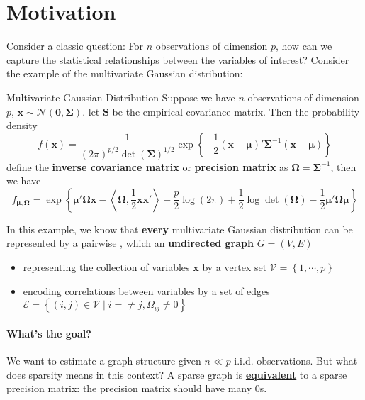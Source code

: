 \documentclass[twoside]{article}
\begin{document}

\section{Motivation}
Consider a classic question: For $n$ observations of dimension $p$, how can we capture the statistical relationships between the variables of interest? Consider the example of the multivariate Gaussian distribution:
\begin{example}{Multivariate Gaussian Distribution}{}
    Suppose we have $n$ observations of dimension $p$, $\mathbf{x}\sim \mathcal{N}(\mathbf{0},\boldsymbol{\Sigma})$. let $\mathbf{S}$ be the empirical covariance matrix. Then the probability density 
    $$
    f(\mathbf{x}) = \frac{1}{(2\pi)^{p/2}\det (\boldsymbol{\Sigma})^{1/2}}\exp\left\{ -\frac{1}{2}(\mathbf{x}-\boldsymbol{\mu})'\boldsymbol{\Sigma}^{-1}(\mathbf{x}-\boldsymbol{\mu}) \right\}
    $$
    define the \textbf{inverse covariance matrix} or \textbf{precision matrix} as $ \boldsymbol{\Omega}=\boldsymbol{\Sigma}^{-1} $, then we have 
    $$
    f_{\mathbf{\mu},\boldsymbol{\Omega}} = \exp \left\{ \boldsymbol{\mu'\Omega x} - \left< \boldsymbol{\Omega},\frac{1}{2}\mathbf{xx}' \right> -\frac{p}{2}\log(2\pi) + \frac{1}{2} \log\det(\boldsymbol{\Omega}) - \frac{1}{2}\boldsymbol{\mu'\Omega\mu} \right\}
    $$
\end{example}
In this example, we know that \textbf{every} multivariate Gaussian distribution can be represented by a pairwise , which an \textbf{\underline{undirected graph}} $G=(V,E)$
\begin{itemize}
    \item representing the collection of variables $\mathbf{x}$ by a vertex set $\mathcal{V}=\left\{1,\cdots,p\right\}$
    \item encoding correlations between variables by a set of edges $\mathcal{E}=\left\{ (i,j)\in \mathcal{V}\mid i=\neq j,\Omega_{ij}\neq 0 \right\}$  
\end{itemize}

\paragraph*{What's the goal?} We want to estimate a  graph structure given $n\ll p$ i.i.d. observations. But what does sparsity means in this context? A sparse graph is \textbf{\underline{equivalent}} to a sparse precision matrix: the precision matrix should have many 0s.
\end{document}
